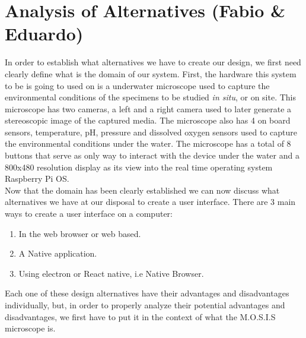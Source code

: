 \section{Analysis of Alternatives (Fabio \& Eduardo)}
In order to establish what alternatives we have to create our design, we first need clearly define what is the domain of our system. First, the hardware this system to be is going to used on is a underwater microscope used to capture the environmental conditions of the specimens to be studied \textit{in situ}, or on site. This microscope has two cameras, a left and a right camera used to later generate a stereoscopic image of the captured media. The microscope also has 4 on board sensors, temperature, pH, pressure and dissolved oxygen sensors used to capture the environmental conditions under the water. The microscope has a total of 8 buttons that serve as only way to interact with the device under the water and a 800x480 resolution display as its view into the real time operating system Raspberry Pi OS.\\
Now that the domain has been clearly established we can now discuss what alternatives we have at our disposal to create a user interface. There are 3 main ways to create a user interface on a computer:
\begin{enumerate}
	\item In the web browser or web based.
	\item A Native application.
	\item Using electron or React native, i.e Native Browser.
\end{enumerate}
Each one of these design alternatives have their advantages and disadvantages individually, but, in order to properly analyze their potential advantages and disadvantages, we first have to put it in the context of what the M.O.S.I.S microscope is.\\
